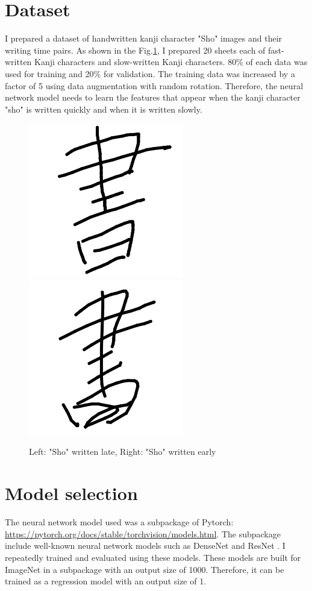 \documentclass[10pt,twocolumn,letterpaper]{article}
\begin{document}
\section{Dataset}
I prepared a dataset of handwritten kanji character "Sho" images and their writing time pairs.
As shown in the Fig.\ref{fig:sho}, I prepared 20 sheets each of fast-written Kanji characters and slow-written Kanji characters.
80\% of each data was used for training and 20\% for validation.
The training data was increased by a factor of 5 using data augmentation with random rotation.
Therefore, the neural network model needs to learn the features that appear when the kanji character "sho" is written quickly and when it is written slowly.
\begin{figure}[h]
    \begin{center}
        \includegraphics[width=0.4\linewidth]{images/U66F8_00003.png}
        \includegraphics[width=0.4\linewidth]{images/U66F8_00030.png}
    \end{center}
    \caption{Left: "Sho" written late, Right: "Sho" written early}
    \label{fig:sho}
\end{figure}

\section{Model selection}
The neural network model used was a subpackage of Pytorch: \url{https://pytorch.org/docs/stable/torchvision/models.html}.
The subpackage include well-known neural network models such as DenseNet \cite{huang2017densely} and ResNet \cite{he2016deep}.
I repeatedly trained and evaluated using these models.
These models are built for ImageNet in a subpackage with an output size of 1000.
Therefore, it can be trained as a regression model with an output size of 1.
\end{document}
